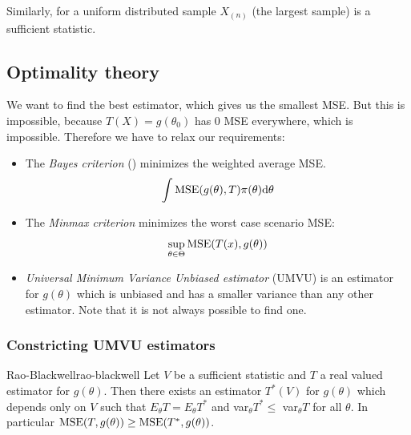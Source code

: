 \documentclass[12pt]{extarticle}
\begin{document}
Similarly, for a uniform distributed sample $X_{(n)}$ (the largest sample) is a sufficient statistic.

\subsection{Optimality theory}

We want to find the best estimator, which gives us the smallest MSE.
But this is impossible, because $T(X) = g(\theta_0)$ has 0 MSE everywhere, which is impossible.
Therefore we have to relax our requirements:
\begin{itemize}
    \item The \emph{Bayes criterion} () minimizes the weighted average MSE.
          \begin{equation}
              \int \MSE(g(\theta), T) \pi(\theta) \dd \theta
          \end{equation}
    \item The \emph{Minmax criterion} minimizes the worst case scenario MSE:
          \begin{equation}
              \sup_{\theta \in \Theta} \MSE(T(x), g(\theta))
          \end{equation}
    \item \emph{Universal Minimum Variance Unbiased estimator} (UMVU) is an estimator for $g(\theta)$
          which is unbiased and has a smaller variance than any other estimator.
          Note that it is not always possible to find one.
\end{itemize}

\subsubsection{Constricting UMVU estimators}

\begin{theorem}{Rao-Blackwell}{rao-blackwell}
    Let $V$ be a sufficient statistic and $T$ a real valued estimator for $g(\theta)$.
    Then there exists an estimator $T^*(V)$ for $g(\theta)$ which depends only on $V$ such that
    $E_\theta T = E_\theta T^*$ and var$_\theta T^* \leq$ var$_\theta T$ for all $\theta$.
    In particular $\MSE(T, g(\theta)) \geq \MSE(T^*, g(\theta))$.
\end{theorem}
\end{document}
